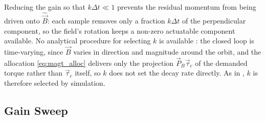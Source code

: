 

Reducing the gain so that $k\Delta t \ll 1$ prevents the residual momentum from
being driven onto $\hat{\vec{B}}$: each sample removes only a fraction $k\Delta t$
of the perpendicular component, so the field's rotation keeps a non-zero
actuatable component available. 
No analytical procedure for selecting $k$ is available
\cite{sidiAttitudeDynamicsKinematics1997}: the closed loop is time-varying, since
$\vec{B}$ varies in direction and magnitude around the orbit, and the allocation
\eqref{eq:magt_alloc} delivers only the projection $\vec{P}_B\vec{\tau}_c$ of the
demanded torque rather than $\vec{\tau}_c$ itself, so $k$ does not set the decay
rate directly. As in \cite{sidiAttitudeDynamicsKinematics1997}, $k$ is therefore
selected by simulation.
\subsection{Gain Sweep}

